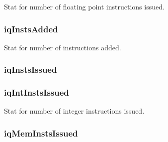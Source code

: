 \label{classInstructionQueue_aa9f2fa124c9f0b4b22461b6717449d9a}
Stat for number of floating point instructions issued. \hypertarget{classInstructionQueue_a435e1ce10c3a7f54a60941e583adeb09}{
\subsubsection[{iqInstsAdded}]{ {\bf iqInstsAdded}}}
\label{classInstructionQueue_a435e1ce10c3a7f54a60941e583adeb09}
Stat for number of instructions added. \hypertarget{classInstructionQueue_accc6261a817718dbb727c65f310df357}{
\subsubsection[{iqInstsIssued}]{ {\bf iqInstsIssued}}}
\label{classInstructionQueue_accc6261a817718dbb727c65f310df357}
\hypertarget{classInstructionQueue_a735f2023e70e53b7889a3a316bd3d57f}{
\subsubsection[{iqIntInstsIssued}]{ {\bf iqIntInstsIssued}}}
\label{classInstructionQueue_a735f2023e70e53b7889a3a316bd3d57f}
Stat for number of integer instructions issued. \hypertarget{classInstructionQueue_a5e7d55d3f07e86e389ca3a715766e108}{
\subsubsection[{iqMemInstsIssued}]{ {\bf iqMemInstsIssued}}}
